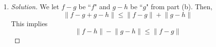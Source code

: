 \documentclass{article}
\begin{document}
\begin{enumerate}
\begin{proof}[Solution]
		We now give an example when this is a strict inequality:
		Let $f = 1$ and $g = -1$ for all $x \in [0,1]$.
		Then
		\[
			\lVert f + g \rVert = \lVert 0 \rVert = 0 <
			2 = 1 + 1 = \lVert f \rVert + \lVert g \rVert
		\]
	\end{proof}
	\item \begin{proof}[Solution]\let\qed\relax
		We let $f - g$ be ``$f$" and $g - h$ be ``$g$" from part (b).
		Then,
		\[
			\lVert f - g + g - h\rVert \leq \lVert f - g\rVert + \lVert g - h\rVert
		\]
		This implies
		\[
			\lVert f - h\rVert - \lVert g - h\rVert \leq \lVert f - g \rVert
		\]
	\end{proof} 
\end{enumerate}
\clearpage
~\clearpage
\end{document}
